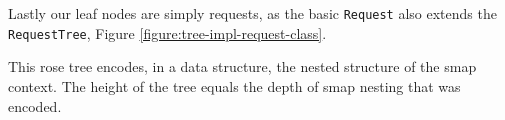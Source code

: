 Lastly our leaf nodes are simply requests, as the basic \texttt{Request} also extends the \texttt{RequestTree}, Figure \ref{figure:tree-impl-request-class}.

This rose tree encodes, in a data structure, the nested structure of the smap context. 
The height of the tree equals the depth of smap nesting that was encoded.




